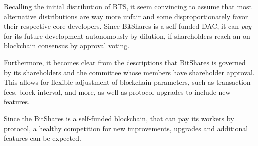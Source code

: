 Recalling the initial distribution of BTS, it seem convincing to assume that
most alternative distributions are way more unfair and some disproportionately
favor their respective core developers. Since BitShares is a self-funded DAC,
it can \emph{pay} for its future development autonomously by dilution, if
shareholders reach an on-blockchain consensus by approval voting.

Furthermore, it becomes clear from the descriptions that BitShares is governed
by its shareholders and the committee whose members have shareholder approval.
This allows for flexible adjustment of blockchain parameters, such as
transaction fees, block interval, and more, as well as protocol upgrades to
include new features.

Since the BitShares is a self-funded blockchain, that can pay its workers by
protocol, a healthy competition for new improvements, upgrades and additional
features can be expected.
